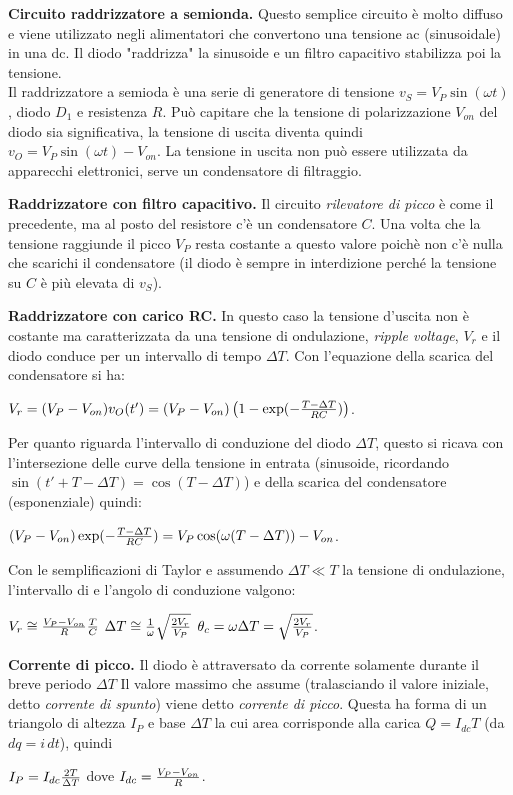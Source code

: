 \documentclass[a4paper,portrait,12pt]{article}
\theoremstyle{definition}
\begin{document}
\textbf{Circuito raddrizzatore a semionda.} Questo semplice circuito è molto diffuso e viene utilizzato negli
alimentatori che convertono una tensione ac (sinusoidale) in una dc. Il diodo "raddrizza" la sinusoide e un
filtro capacitivo stabilizza poi la tensione.\\
Il raddrizzatore a semioda è una serie di generatore di tensione $v_S = V_P \sin (\omega t)$, diodo $D_1$ e
resistenza $R$. Può capitare che la tensione di polarizzazione $V_{on}$ del diodo sia significativa, la 
tensione di uscita diventa quindi $v_O = V_P \sin (\omega t) - V_{on}$. La tensione in uscita non può essere
utilizzata da apparecchi elettronici, serve un condensatore di filtraggio.
\bigskip

\textbf{Raddrizzatore con filtro capacitivo.} Il circuito \textit{rilevatore di picco} è come il precedente,
ma al posto del resistore c'è un condensatore $C$. Una volta che la tensione raggiunde il picco $V_P$ 
resta costante a questo valore poichè non c'è nulla che scarichi il condensatore (il diodo è sempre in 
interdizione perché la tensione su $C$ è più elevata di $v_S$).
\bigskip

\textbf{Raddrizzatore con carico RC.} In questo caso la tensione d'uscita non è costante ma caratterizzata da
una tensione di ondulazione, \textit{ripple voltage}, $V_r$ e il diodo conduce per un intervallo di tempo
$\Delta T$. Con l'equazione della scarica del condensatore si ha:
\begin{center}
$V_r = (V_P - V_{on}) v_O(t') = (V_P - V_{on}) \left(1-\exp(-{T - \Delta T \over RC})\right)$.
\end{center}
Per quanto riguarda l'intervallo di conduzione del diodo $\Delta T$, questo si ricava con l'intersezione
delle curve della tensione in entrata (sinusoide, ricordando $\sin(t' + T - \Delta T) = \cos(T - \Delta T)$) 
e della scarica del condensatore (esponenziale) quindi:
\begin{center}
$(V_P-V_{on})\exp(-{T-\Delta T \over RC})=V_P\cos(\omega(T-\Delta T)) - V_{on}$.
\end{center}
Con le semplificazioni di Taylor e assumendo $\Delta T \ll T$ la tensione di ondulazione, l'intervallo di 
e l'angolo di conduzione valgono:
\begin{center}
$V_r \cong {V_P - V_{on} \over R}{T \over C}$ \quad $\Delta T \cong {1 \over \omega}\sqrt{{2V_r \over V_P}}$
\quad $\theta_c = \omega \Delta T = \sqrt{{2V_r \over V_P}}$.
\end{center}
\bigskip

\textbf{Corrente di picco.} Il diodo è attraversato da corrente solamente durante il breve periodo $\Delta T$
Il valore massimo che assume (tralasciando il valore iniziale, detto \textit{corrente di spunto}) viene
detto \textit{corrente di picco}. Questa ha forma di un triangolo di altezza $I_P$ e base $\Delta T$ la cui
area corrisponde alla carica $Q = I_{dc} T$ (da $dq = i\,dt$), quindi
\begin{center}
$I_P = I_{dc} {2T \over \Delta T}$ \quad dove \quad $I_{dc} = {V_P - V_{on} \over R}$.
\end{center}
\bigskip
\end{document}
